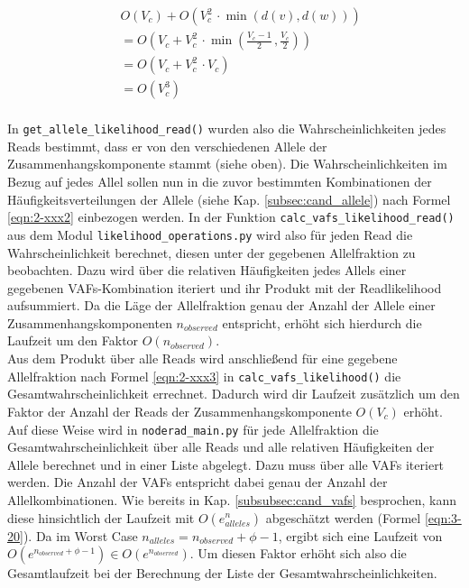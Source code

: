 \begin{equation} \label{eqn:3-25}
\tag{3-25}
\begin{aligned}
&\ {} O(V_{c}) + O(V_{c}^2 \, \cdotp \min (d(v), d(w)))  \\
& \ = O\left( V_{c} + V_{c}^2 \, \cdotp \min \left( \frac{V_{c}-1}{2}\,, \frac{V_{c}}{2}\right) \right) \\
&\ = O(V_{c} + V_{c}^2 \, \cdotp V_{c}) \\
&\ = O(V_{c}^3) \\
\end{aligned}
\end{equation}

In  \lstinline|get_allele_likelihood_read()| wurden also die Wahrscheinlichkeiten jedes Reads bestimmt, dass er von den verschiedenen Allele der Zusammenhangskomponente stammt (siehe oben). Die Wahrscheinlichkeiten im Bezug auf jedes Allel sollen nun in die zuvor bestimmten Kombinationen der Häufigkeitsverteilungen der Allele (siehe Kap. \ref{subsec:cand_allele}) nach Formel \eqref{eqn:2-xxx2} einbezogen werden. In der Funktion \lstinline|calc_vafs_likelihood_read()| aus dem Modul \lstinline|likelihood_operations.py| wird also für jeden Read die Wahrscheinlichkeit berechnet, diesen unter der gegebenen Allelfraktion zu beobachten. Dazu wird über die relativen Häufigkeiten jedes Allels einer gegebenen VAFs-Kombination iteriert und ihr Produkt mit der Readlikelihood aufsummiert. Da die Läge der Allelfraktion genau der Anzahl der Allele einer Zusammenhangskomponenten $ n_{observed} $ entspricht, erhöht sich hierdurch die Laufzeit um den Faktor $ O(n_{observed}) $. \\

Aus dem Produkt über alle Reads wird anschließend für eine gegebene Allelfraktion nach Formel \eqref{eqn:2-xxx3} in \lstinline|calc_vafs_likelihood()| die Gesamtwahrscheinlichkeit errechnet. Dadurch wird dir Laufzeit zusätzlich um den Faktor der Anzahl der Reads der Zusammenhangskomponente $ O(V_{c}) $ erhöht.\\

Auf diese Weise wird in \lstinline|noderad_main.py| für jede Allelfraktion die Gesamtwahrscheinlichkeit über alle Reads und alle relativen Häufigkeiten der Allele berechnet und in einer Liste abgelegt. Dazu muss über alle VAFs iteriert werden. Die Anzahl der VAFs entspricht dabei genau der Anzahl der Allelkombinationen. Wie bereits in Kap. \ref{subsubsec:cand_vafs} besprochen, kann diese hinsichtlich der Laufzeit mit $ O(e^n_{alleles}) $ abgeschätzt werden (Formel \eqref{eqn:3-20}). Da im Worst Case $n_{alleles} = n_{observed} + \phi - 1$, ergibt sich eine Laufzeit von $ O(e^{n_{observed} + \phi - 1}) \in O(e^{n_{observed}}) $. Um diesen Faktor erhöht sich also die Gesamtlaufzeit bei der Berechnung der Liste der Gesamtwahrscheinlichkeiten. \\

